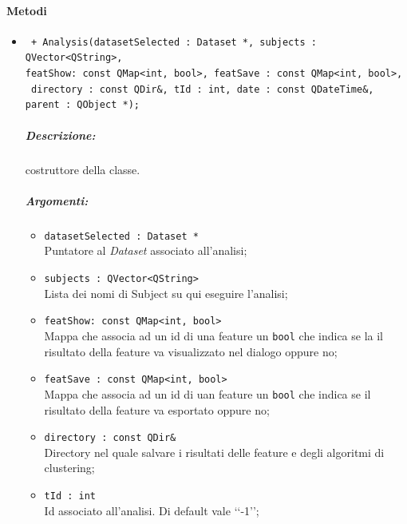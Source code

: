 \color{black}
\paragraph{Metodi \\}
	\begin{itemize}
		\item \color{blue}\verb! + Analysis(datasetSelected : Dataset *, subjects : QVector<QString>, !\\
								    \verb!featShow: const QMap<int, bool>, featSave : const QMap<int, bool>,!\\
							  		\verb! directory : const QDir&, tId : int, date : const QDateTime&, parent : QObject *);!\\
							  
		\color{black}
		\subparagraph{Descrizione:} costruttore della classe.
		
		\subparagraph{Argomenti:}
			\begin{itemize}
				\item \color{RoyalPurple}\verb!datasetSelected : Dataset *!\\
				\color{black}Puntatore al \textsl{Dataset} associato all'analisi;
				
				\item \color{RoyalPurple}\verb!subjects : QVector<QString>!\\
				\color{black}Lista dei nomi di Subject\g{} su qui eseguire l'analisi;
				
				\item \color{RoyalPurple}\verb!featShow: const QMap<int, bool>!\\
				\color{black}Mappa che associa ad un id di una feature\g{} un \verb!bool! che indica se la il risultato della feature\g{} va visualizzato nel dialogo oppure no;
				
				\item \color{RoyalPurple}\verb!featSave : const QMap<int, bool>!\\
				\color{black}Mappa che associa ad un id di uan feature\g{} un \verb!bool! che indica se il risultato della feature\g{} va esportato oppure no;
				
				\item \color{RoyalPurple}\verb!directory : const QDir&!\\
				\color{black}Directory nel quale salvare i risultati delle feature\g{} e degli algoritmi di clustering\g{};
				
				\item \color{RoyalPurple}\verb!tId : int!\\
				\color{black}Id associato all'analisi. Di default vale \lq\lq{}-1\rq\rq{};
				

\end{itemize}
\end{itemize}

